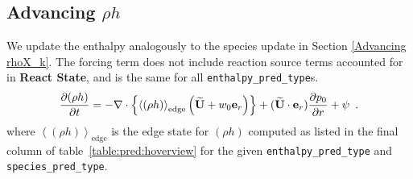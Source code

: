 \subsection{Advancing $\rho h$}
We update the enthalpy analogously to the species update in 
Section \ref{Advancing rhoX_k}.  The forcing term does not include reaction
source terms accounted for in {\bf React State}, and is the same
for all {\tt enthalpy\_pred\_type}s.
\begin{equation}
\frac{\partial(\rho h)}{\partial t} = 
-\nabla\cdot\left\{\left \langle (\rho h) \right \rangle_\mathrm{edge}
 \left(\widetilde{{\bf U}} + w_0{\bf e}_r\right)\right\} + (\widetilde{{\bf U}} \cdot \mathbf{e}_r)\frac{\partial p_0}{\partial r} + \psi  \enskip .
\end{equation}
where $\left \langle (\rho h) \right \rangle_\mathrm{edge}$ is the
edge state for $(\rho h)$ computed as listed in the final column of
table~\ref{table:pred:hoverview} for the given {\tt enthalpy\_pred\_type}
and {\tt species\_pred\_type}.







